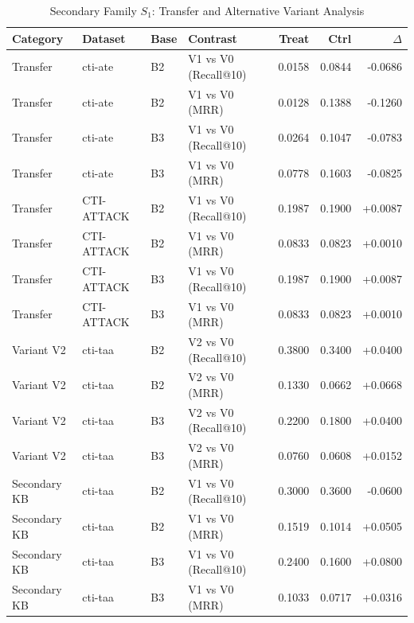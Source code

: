 \begin{table}[htbp]
\centering
\caption{Secondary Family $S_1$: Transfer and Alternative Variant Analysis}
\label{tab:family_s1}
\small
\begin{tabular}{llllrrr}
\hline
\textbf{Category} & \textbf{Dataset} & \textbf{Base} & \textbf{Contrast} & \textbf{Treat} & \textbf{Ctrl} & \textbf{$\Delta$} \\
\hline
Transfer & cti-ate & B2 & V1 vs V0 (Recall@10) & 0.0158 & 0.0844 & -0.0686 \\
Transfer & cti-ate & B2 & V1 vs V0 (MRR) & 0.0128 & 0.1388 & -0.1260 \\
Transfer & cti-ate & B3 & V1 vs V0 (Recall@10) & 0.0264 & 0.1047 & -0.0783 \\
Transfer & cti-ate & B3 & V1 vs V0 (MRR) & 0.0778 & 0.1603 & -0.0825 \\
Transfer & CTI-ATTACK & B2 & V1 vs V0 (Recall@10) & 0.1987 & 0.1900 & +0.0087 \\
Transfer & CTI-ATTACK & B2 & V1 vs V0 (MRR) & 0.0833 & 0.0823 & +0.0010 \\
Transfer & CTI-ATTACK & B3 & V1 vs V0 (Recall@10) & 0.1987 & 0.1900 & +0.0087 \\
Transfer & CTI-ATTACK & B3 & V1 vs V0 (MRR) & 0.0833 & 0.0823 & +0.0010 \\
Variant V2 & cti-taa & B2 & V2 vs V0 (Recall@10) & 0.3800 & 0.3400 & +0.0400 \\
Variant V2 & cti-taa & B2 & V2 vs V0 (MRR) & 0.1330 & 0.0662 & +0.0668 \\
Variant V2 & cti-taa & B3 & V2 vs V0 (Recall@10) & 0.2200 & 0.1800 & +0.0400 \\
Variant V2 & cti-taa & B3 & V2 vs V0 (MRR) & 0.0760 & 0.0608 & +0.0152 \\
Secondary KB & cti-taa & B2 & V1 vs V0 (Recall@10) & 0.3000 & 0.3600 & -0.0600 \\
Secondary KB & cti-taa & B2 & V1 vs V0 (MRR) & 0.1519 & 0.1014 & +0.0505 \\
Secondary KB & cti-taa & B3 & V1 vs V0 (Recall@10) & 0.2400 & 0.1600 & +0.0800 \\
Secondary KB & cti-taa & B3 & V1 vs V0 (MRR) & 0.1033 & 0.0717 & +0.0316 \\
\hline
\end{tabular}
\end{table}

